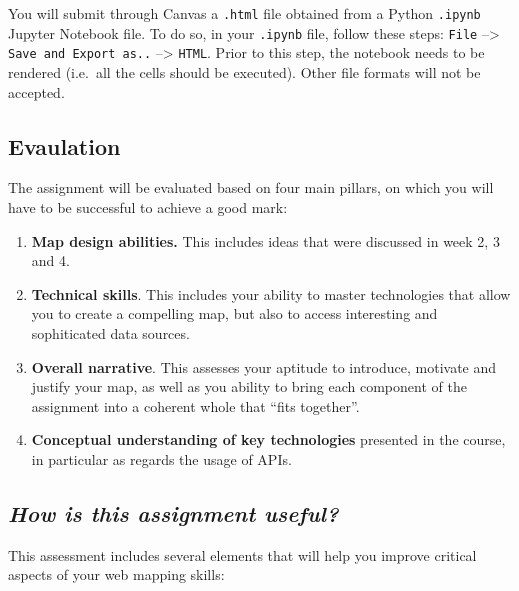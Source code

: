 \documentclass[
  letterpaper,
  DIV=11,
  numbers=noendperiod]{scrreprt}
\providecommand{\tightlist}{%
  \setlength{\itemsep}{0pt}\setlength{\parskip}{0pt}}\usepackage{longtable,booktabs,array}
\begin{document}
You will submit through Canvas a \texttt{.html} file obtained from a
Python \texttt{.ipynb} Jupyter Notebook file. To do so, in your
\texttt{.ipynb} file, follow these steps: \texttt{File} --\textgreater{}
\texttt{Save\ and\ Export\ as..} --\textgreater{} \texttt{HTML}. Prior
to this step, the notebook needs to be rendered (i.e.~all the cells
should be executed). Other file formats will not be accepted.

\hypertarget{evaulation}{%
\subsection*{Evaulation}\label{evaulation}}

The assignment will be evaluated based on four main pillars, on which
you will have to be successful to achieve a good mark:

\begin{enumerate}
\def\labelenumi{\arabic{enumi}.}
\tightlist
\item
  \textbf{Map design abilities.} This includes ideas that were discussed
  in week 2, 3 and 4.
\item
  \textbf{Technical skills}. This includes your ability to master
  technologies that allow you to create a compelling map, but also to
  access interesting and sophiticated data sources.
\item
  \textbf{Overall narrative}. This assesses your aptitude to introduce,
  motivate and justify your map, as well as you ability to bring each
  component of the assignment into a coherent whole that ``fits
  together''.
\item
  \textbf{Conceptual understanding of key technologies} presented in the
  course, in particular as regards the usage of APIs.
\end{enumerate}

\hypertarget{how-is-this-assignment-useful}{%
\subsection*{\texorpdfstring{\emph{How is this assignment
useful?}}{How is this assignment useful?}}\label{how-is-this-assignment-useful}}

This assessment includes several elements that will help you improve
critical aspects of your web mapping skills:
\end{document}
